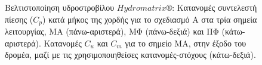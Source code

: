 \begin{figure}[h!]
\begin{minipage}[b]{0.5\linewidth}
\end{minipage}
\begin{minipage}[b]{0.5\linewidth}
 \centering
\end{minipage}
\begin{minipage}[b]{0.5\linewidth}
 \centering
\end{minipage}
\caption{Βελτιστοποίηση  υδροστροβίλου $Hydromatrix\circledR$: Κατανομές συντελεστή πίεσης ($C_p$) κατά μήκος της χορδής για το σχεδιασμό Α στα τρία σημεία λειτουργίας, ΜΑ (πάνω-αριστερά), ΜΦ (πάνω-δεξιά) και ΠΦ (κάτω-αριστερά). Κατανομές $C_u$ και $C_m$ για το σημείο ΜΑ, στην έξοδο του δρομέα, μαζί με τις χρησιμοποιηθείσες κατανομές-στόχους (κάτω-δεξιά).}
\label{Matrix-A}
\end{figure}

